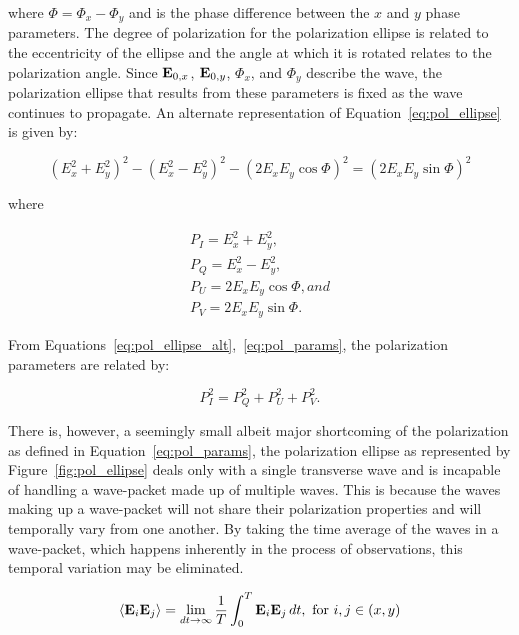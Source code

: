 \noindent where $\Phi = \Phi_{x} - \Phi_{y}$ and is the phase difference between the $x$ and $y$ phase parameters. The degree of polarization for the polarization ellipse is related to the eccentricity of the ellipse and the angle at which it is rotated relates to the polarization angle. Since $\mathbf{E}_{0, x}$, $\mathbf{E}_{0, y}$, $\Phi_{x}$, and $\Phi_{y}$ describe the wave, the polarization ellipse that results from these parameters is fixed as the wave continues to propagate. An alternate representation of Equation~\ref{eq:pol_ellipse} is given by:

\begin{equation}
  (E_{x}^{2} + E_{y}^{2})^{2} - (E_{x}^{2} - E_{y}^{2})^{2} - (2 E_{x} E_{y} \cos \Phi)^{2} = (2 E_{x} E_{y} \sin \Phi)^{2}
  \label{eq:pol_ellipse_alt}
\end{equation}

\noindent where

\begin{equation}
  \begin{gathered}
    P_{I} = E_{x}^{2} + E_{y}^{2}, \\
    P_{Q} = E_{x}^{2} - E_{y}^{2}, \\
    P_{U} = 2 E_{x} E_{y} \cos \Phi, and \\
    P_{V} = 2 E_{x} E_{y} \sin \Phi.
  \end{gathered}
  \label{eq:pol_params}
\end{equation}

From Equations~\ref{eq:pol_ellipse_alt},~\ref{eq:pol_params}, the polarization parameters are related by:

\begin{equation}
  P_{I}^{2} = P_{Q}^{2} + P_{U}^{2} + P_{V}^{2}.
\end{equation}

There is, however, a seemingly small albeit major shortcoming of the polarization as defined in Equation~\ref{eq:pol_params}, the polarization ellipse as represented by Figure~\ref{fig:pol_ellipse} deals only with a single transverse wave and is incapable of handling a wave-packet made up of multiple waves. This is because the waves making up a wave-packet will not share their polarization properties and will temporally vary from one another. By taking the time average of the waves in a wave-packet, which happens inherently in the process of observations, this temporal variation may be eliminated.

\begin{equation}
  \left< \mathbf{E}_{i} \mathbf{E}_{j} \right> = \lim_{dt \rightarrow \infty} \frac{1}{T} \int_{0}^{T} \mathbf{E}_{i} \mathbf{E}_{j}\,dt, \text{ for } i, j \in (x, y)
  \label{eq:pol_t_avg}
\end{equation}

